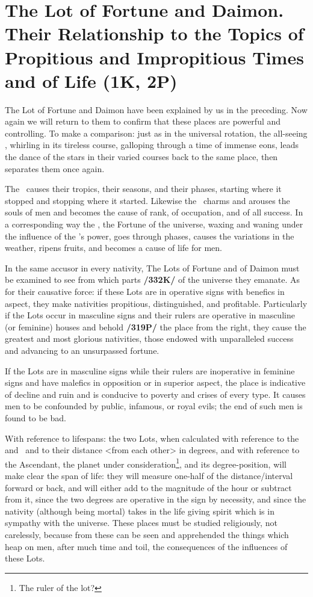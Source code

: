 \section{The Lot of Fortune and Daimon. Their Relationship to the Topics of Propitious and Impropitious Times and of Life (1K, 2P)}

The Lot of Fortune and Daimon have been explained by us in the preceding. Now again we will return to them to confirm that these places are powerful and controlling. To make a comparison: just as in
the universal rotation, the all-seeing \Sun, whirling in its tireless course, galloping through a time of immense eons, leads the dance of the stars in their varied courses back to the same place, then separates them once again. 

The \Sun\, causes their tropics, their seasons, and their phases, starting where it stopped and stopping where it started. Likewise the \Sun\, charms and arouses the souls of men and becomes the cause of rank, of occupation, and of all success. In a corresponding way the \Moon, the Fortune of the universe, waxing and waning under the influence of the \Sun’s power, goes through phases, causes the variations in the weather, ripens fruits, and becomes a cause of life for men. 

In the same accusor in every nativity, The Lots of Fortune and of Daimon must be examined to see from which parts \textbf{/332K/} of the universe they emanate. As for their causative force: if these Lots are in operative signs with benefics in aspect, they make nativities propitious, distinguished, and profitable. Particularly if the Lots occur in
masculine signs and their rulers are operative in masculine (or feminine) houses and behold \textbf{/319P/} the place from the right, they cause the greatest and most glorious nativities, those endowed with unparalleled success and advancing to an unsurpassed fortune. 

If the Lots are in masculine signs while their rulers are inoperative in feminine signs and have malefics in opposition or in superior aspect, the place is indicative of decline and ruin and is conducive to poverty and crises of every type. It causes men to be confounded by public, infamous, or royal evils; the end of such men is found to be bad.

With reference to lifespans: the two Lots, when calculated with reference to the \Sun\, and \Moon\, and to their distance <from each other> in degrees, and with reference to the Ascendant, the planet under consideration\footnote{The ruler of the lot?}, and its degree-position, will make clear the span of life: they will measure one-half of the distance/interval forward or back, and will either add to the magnitude of the hour or subtract from it, since the two degrees are operative in the sign by necessity, and since the nativity (although being mortal) takes in the life giving spirit which is in sympathy with the universe. These places must be studied religiously, not carelessly, because from these can be seen and  apprehended the things which heap on men, after much time and toil, the consequences of the influences of these Lots. 

